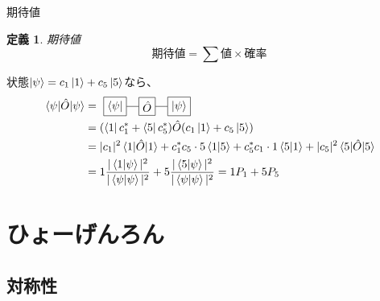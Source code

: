 \documentclass[dvipdfm]{beamer}
\newtheorem*{defn}{定義}
\begin{document}
\begin{frame}{期待値}
    \begin{defn}{期待値}
        \begin{equation*}
            \text{期待値}=\sum\text{値}\times\text{確率}
        \end{equation*}
    \end{defn}
    \begin{example}
        状態$\ket{\psi}=c_1\ket{1}+c_5\ket{5}$なら、
        \begin{equation*}
            \begin{split}
                \ev{\hat{O}}{\psi}
                &=
                \vcenter{\hbox{
                    \begin{tikzpicture}
                        \node at (0,0)[draw,rectangle](O){$\hat{O}$};
                        \node at (-1,0)[draw,rectangle](left){$\bra{\psi}$};
                        \node at (1,0)[draw,rectangle](right){$\ket{\psi}$};
                        \draw(left.east)--(O.west)(O.east)--(right.west);
                    \end{tikzpicture}
                }}
                \\
                &=
                (\bra{1}c_1^\ast+\bra{5}c_5^\ast)\hat{O}(c_1\ket{1}+c_5\ket{5})
                \\
                &=
                |c_1|^2\ev{\hat{O}}{1}
                +
                c_1^\ast c_5\cdot5\bra{1}\ket{5}
                +
                c_5^\ast c_1\cdot1\bra{5}\ket{1}
                +
                |c_5|^2\ev{\hat{O}}{5}
                \\
                &=
                1\frac{|\braket{1}{\psi}|^2}{|\braket{\psi}|^2}
                +
                5\frac{|\braket{5}{\psi}|^2}{|\braket{\psi}|^2}
                =
                1P_1+5P_5
            \end{split}
        \end{equation*}
    \end{example}
\end{frame}


\section{ひょーげんろん}

\subsection{対称性}
\end{document}
